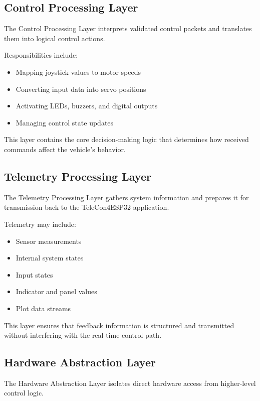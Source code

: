 \subsection{Control Processing Layer}

The Control Processing Layer interprets validated control packets and translates them into logical control actions.

Responsibilities include:

\begin{itemize}
	\item Mapping joystick values to motor speeds
	\item Converting input data into servo positions
	\item Activating LEDs, buzzers, and digital outputs
	\item Managing control state updates
\end{itemize}

This layer contains the core decision-making logic that determines how received commands affect the vehicle's behavior.

\subsection{Telemetry Processing Layer}

The Telemetry Processing Layer gathers system information and prepares it for transmission back to the TeleCon4ESP32 application.

Telemetry may include:

\begin{itemize}
	\item Sensor measurements
	\item Internal system states
	\item Input states
	\item Indicator and panel values
	\item Plot data streams
\end{itemize}

This layer ensures that feedback information is structured and transmitted without interfering with the real-time control path.

\subsection{Hardware Abstraction Layer}

The Hardware Abstraction Layer isolates direct hardware access from higher-level control logic.

